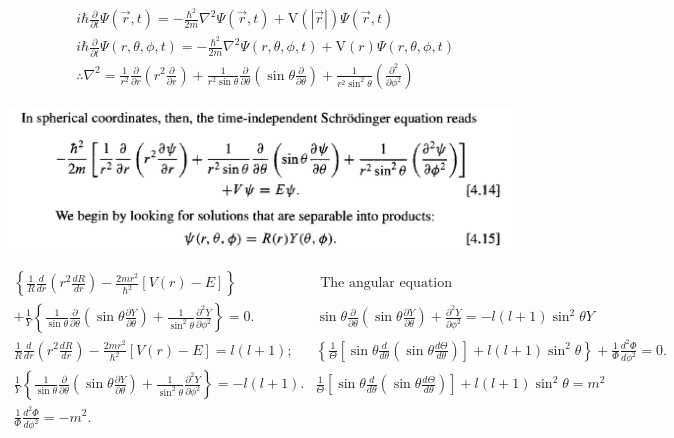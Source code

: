 \documentclass{article}
\begin{document}
$$
\begin{aligned}
&i \hbar \frac{\partial}{\partial t} \Psi(\vec{r}, t)=-\frac{\hbar^{2}}{2 m} \nabla^{2} \Psi(\vec{r}, t)+\mathrm{V}(|\vec{r}|) \Psi(\vec{r}, t) \\
&i \hbar \frac{\partial}{\partial t} \Psi(r, \theta, \phi, t)=-\frac{\hbar^{2}}{2 m} \nabla^{2} \Psi(r, \theta, \phi, t)+\mathrm{V}(r) \Psi(r, \theta, \phi, t) \\
&\therefore \nabla^{2}=\frac{1}{r^{2}} \frac{\partial}{\partial r}\left(r^{2} \frac{\partial}{\partial r}\right)+\frac{1}{r^{2} \sin \theta} \frac{\partial}{\partial \theta}\left(\sin \theta \frac{\partial}{\partial \theta}\right)+\frac{1}{r^{2} \sin ^{2} \theta}\left(\frac{\partial^{2}}{\partial \phi^{2}}\right)
\end{aligned}
$$

\includegraphics[width = 0.5 \textwidth]{Lecture20/1.png}

$$
\begin{array}{cc}
\left\{\frac{1}{R} \frac{d}{d r}\left(r^{2} \frac{d R}{d r}\right)-\frac{2 m r^{2}}{\hbar^{2}}[V(r)-E]\right\} & \text { The angular equation } \\
+\frac{1}{Y}\left\{\frac{1}{\sin \theta} \frac{\partial}{\partial \theta}\left(\sin \theta \frac{\partial Y}{\partial \theta}\right)+\frac{1}{\sin ^{2} \theta} \frac{\partial^{2} Y}{\partial \phi^{2}}\right\}=0 . & \sin \theta \frac{\partial}{\partial \theta}\left(\sin \theta \frac{\partial Y}{\partial \theta}\right)+\frac{\partial^{2} Y}{\partial \phi^{2}}=-l(l+1) \sin ^{2} \theta Y \\
\frac{1}{R} \frac{d}{d r}\left(r^{2} \frac{d R}{d r}\right)-\frac{2 m r^{2}}{\hbar^{2}}[V(r)-E]=l(l+1) ; & \left\{\frac{1}{\Theta}\left[\sin \theta \frac{d}{d \theta}\left(\sin \theta \frac{d \Theta}{d \theta}\right)\right]+l(l+1) \sin ^{2} \theta\right\}+\frac{1}{\Phi} \frac{d^{2} \Phi}{d \phi^{2}}=0 . \\
\frac{1}{Y}\left\{\frac{1}{\sin \theta} \frac{\partial}{\partial \theta}\left(\sin \theta \frac{\partial Y}{\partial \theta}\right)+\frac{1}{\sin ^{2} \theta} \frac{\partial^{2} Y}{\partial \phi^{2}}\right\}=-l(l+1) . & \frac{1}{\Theta}\left[\sin \theta \frac{d}{d \theta}\left(\sin \theta \frac{d \Theta}{d \theta}\right)\right]+l(l+1) \sin ^{2} \theta=m^{2} \\
\frac{1}{\Phi} \frac{d^{2} \Phi}{d \phi^{2}}=-m^{2} .
\end{array}
$$
\end{document}
